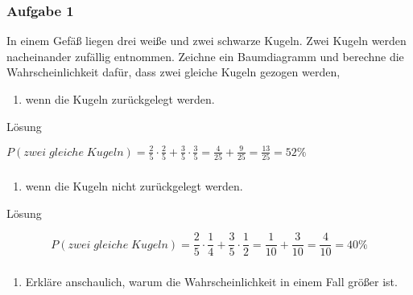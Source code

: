 \documentclass[
  ngerman,
]{book}
\providecommand{\tightlist}{%
  \setlength{\itemsep}{0pt}\setlength{\parskip}{0pt}}
\begin{document}
\hypertarget{section-133}{%
\subsubsection*{}\label{section-133}}

\hypertarget{aufgabe-1-14}{%
\subsubsection*{Aufgabe 1}\label{aufgabe-1-14}}

In einem Gefäß liegen drei weiße und zwei schwarze Kugeln. Zwei Kugeln werden nacheinander zufällig entnommen. Zeichne ein Baumdiagramm und berechne die Wahrscheinlichkeit dafür, dass zwei gleiche Kugeln gezogen werden,

\begin{enumerate}
\def\labelenumi{\alph{enumi})}
\tightlist
\item
  wenn die Kugeln zurückgelegt werden.
\end{enumerate}

Lösung

\(P(zwei\;gleiche\;Kugeln) = \frac{2}{5}\cdot\frac{2}{5} + \frac{3}{5} \cdot\frac{3}{5} = \frac{4}{25} + \frac{9}{25} = \frac{13}{25} = 52\%\)

\hypertarget{section-134}{%
\subsubsection*{}\label{section-134}}

\begin{enumerate}
\def\labelenumi{\alph{enumi})}
\setcounter{enumi}{1}
\tightlist
\item
  wenn die Kugeln nicht zurückgelegt werden.
\end{enumerate}

Lösung

\[ P(zwei\;gleiche\;Kugeln) = \frac{2}{5}\cdot\frac{1}{4} + \frac{3}{5} \cdot\frac{1}{2} = \frac{1}{10} + \frac{3}{10} = \frac{4}{10} = 40\% \]

\hypertarget{section-135}{%
\subsubsection*{}\label{section-135}}

\begin{enumerate}
\def\labelenumi{\alph{enumi})}
\setcounter{enumi}{2}
\tightlist
\item
  Erkläre anschaulich, warum die Wahrscheinlichkeit in einem Fall größer ist.
\end{enumerate}
\end{document}
